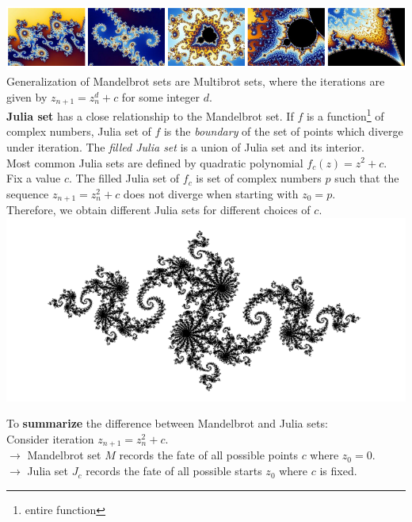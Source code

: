 \documentclass[12pt]{article}
\begin{document}
\includegraphics[width = \textwidth]{zoomed_mandel}
Generalization of Mandelbrot sets are Multibrot sets, where the iterations are given by $z_{n+1} = z_{n}^{d} + c$ for some integer $d$.\\

\noindent\textbf{Julia set} has a close relationship to the Mandelbrot set. If $f$ is a function\footnote{entire function} of complex numbers, Julia set of $f$ is the \emph{boundary} of the set of points which diverge under iteration. The \emph{filled Julia set} is a union of Julia set and its interior. \\
Most common Julia sets are defined by quadratic polynomial $f_c(z) = z^2 + c$. Fix a value $c$. The filled Julia set of $f_c$ is set of complex numbers $p$ such that the sequence $z_{n+1} = z_n^2 + c$ does not diverge when starting with $z_0 = p$. \\
Therefore, we obtain different Julia sets for different choices of $c$.\\
\includegraphics[width = \textwidth]{julia}

\noindent To \textbf{summarize} the difference between Mandelbrot and Julia sets: \\
Consider iteration $z_{n+1} = z_n^2 + c$.\\
$\rightarrow$ Mandelbrot set $M$ records the fate of all possible points $c$ where $z_0 = 0$. \\
$\rightarrow$ Julia set $J_c$ records the fate of all possible starts $z_0$ where $c$ is fixed.\\
\end{document}
